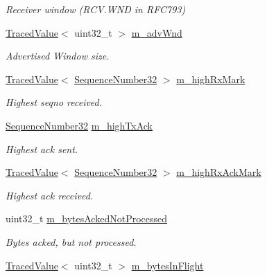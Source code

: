 \begin{DoxyCompactItemize}
\begin{DoxyCompactList}\small\item\em Receiver window (R\+C\+V.\+W\+ND in R\+F\+C793) \end{DoxyCompactList}\item 
\hyperlink{classns3_1_1TracedValue}{Traced\+Value}$<$ uint32\+\_\+t $>$ \hyperlink{classns3_1_1TcpSocketBase_a12a1c017e48895fbe36df0d54a509041}{m\+\_\+adv\+Wnd}
\begin{DoxyCompactList}\small\item\em Advertised Window size. \end{DoxyCompactList}\item 
\hyperlink{classns3_1_1TracedValue}{Traced\+Value}$<$ \hyperlink{group__network_gacb2070e4e98d2d5135c9bede58f07a03}{Sequence\+Number32} $>$ \hyperlink{classns3_1_1TcpSocketBase_a9e93feb3fed4ad395da7f3abea173062}{m\+\_\+high\+Rx\+Mark}
\begin{DoxyCompactList}\small\item\em Highest seqno received. \end{DoxyCompactList}\item 
\hyperlink{group__network_gacb2070e4e98d2d5135c9bede58f07a03}{Sequence\+Number32} \hyperlink{classns3_1_1TcpSocketBase_a593fd39ccf865253c39bae9721263255}{m\+\_\+high\+Tx\+Ack}
\begin{DoxyCompactList}\small\item\em Highest ack sent. \end{DoxyCompactList}\item 
\hyperlink{classns3_1_1TracedValue}{Traced\+Value}$<$ \hyperlink{group__network_gacb2070e4e98d2d5135c9bede58f07a03}{Sequence\+Number32} $>$ \hyperlink{classns3_1_1TcpSocketBase_aa53b354456e23b35a97c367e4e03cd97}{m\+\_\+high\+Rx\+Ack\+Mark}
\begin{DoxyCompactList}\small\item\em Highest ack received. \end{DoxyCompactList}\item 
uint32\+\_\+t \hyperlink{classns3_1_1TcpSocketBase_a6224a29116682fbbc66f43bcb114239c}{m\+\_\+bytes\+Acked\+Not\+Processed}
\begin{DoxyCompactList}\small\item\em Bytes acked, but not processed. \end{DoxyCompactList}\item 
\hyperlink{classns3_1_1TracedValue}{Traced\+Value}$<$ uint32\+\_\+t $>$ \hyperlink{classns3_1_1TcpSocketBase_ad7acd30c8700b980142ddd38a52a5401}{m\+\_\+bytes\+In\+Flight}

\end{DoxyCompactItemize}
